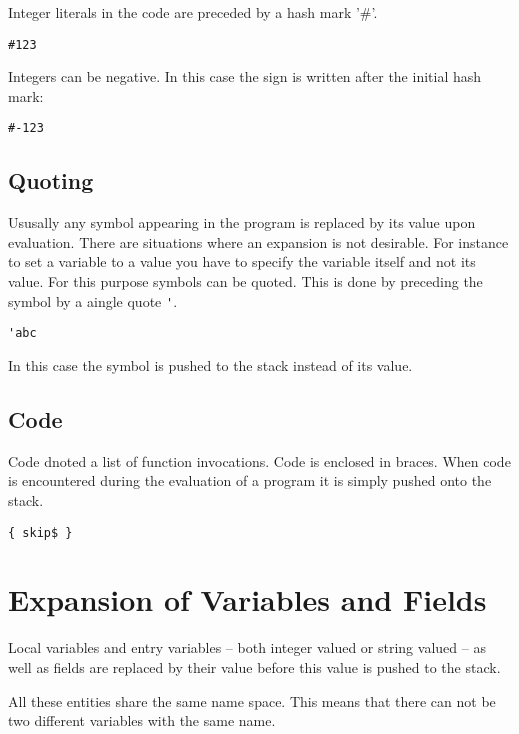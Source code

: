 Integer literals in the code are preceded by a hash mark '\#'.

\begin{lstlisting}[language=bst]
  #123
\end{lstlisting}

Integers can be negative. In this case the sign is written after the
initial hash mark:

\begin{lstlisting}[language=bst]
  #-123
\end{lstlisting}


\subsection{Quoting}\label{sec:bst.quote}

Ususally any symbol appearing in the program is replaced by its value
upon evaluation. There are situations where an expansion is not
desirable. For instance to set a variable to a value you have to
specify the variable itself and not its value. For this purpose
symbols can be quoted. This is done by preceding the symbol by a
aingle quote \verb|'|.

\begin{lstlisting}[language=bst]
  'abc
\end{lstlisting}

In this case the symbol is pushed to the stack instead of its value.

\subsection{Code}\label{sec:bst.code}

Code dnoted a list of function invocations. Code is enclosed in
braces. When code is encountered during the evaluation of a program it
is simply pushed onto the stack.

\begin{lstlisting}[language=bst]
  { skip$ }
\end{lstlisting}

\section{Expansion of Variables and Fields}

Local variables and entry variables -- both integer valued or string
valued -- as well as fields are replaced by their value before this
value is pushed to the stack.

All these entities share the same name space. This means that there
can not be two different variables with the same name.


